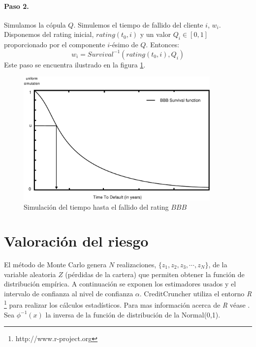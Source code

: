\paragraph{Paso 2.} Simulamos la c\'opula $Q$. Simulemos el tiempo de fallido del
cliente $i$, $w_i$. Disponemos del rating inicial, $rating(t_0,i)$ y un valor
$Q_i \in [0,1]$ proporcionado por el componente $i$-\'esimo de $Q$. Entonces:
\begin{displaymath}
w_i = Survival^{-1}(rating(t_0,i),Q_i)
\end{displaymath}
Este paso se encuentra ilustrado en la figura \ref{simttd}.

\begin{figure}[!hb]
\begin{center}
\includegraphics[width=10cm,angle=0]{./images/simttd.eps}
\caption{Simulaci\'on del tiempo hasta el fallido del rating $BBB$}
\label{simttd}
\end{center}
\end{figure}



\section{Valoraci\'on del riesgo}

El m\'etodo de Monte Carlo genera $N$ realizaciones, $\{z_1,z_2,z_3,\cdots,z_N\}$,
de la variable aleatoria $Z$ (p\'erdidas de la cartera) que permiten obtener la
funci\'on de distribuci\'on emp\'irica. A continuaci\'on se exponen los estimadores
usados y el intervalo de confianza al nivel de confianza $\alpha$. CreditCruncher
utiliza el entorno \emph{R} \footnote{http://www.r-project.org} para realizar los
c\'alculos estad\'isticos. Para mas informaci\'on acerca de \emph{R} v\'ease \cite{stats:R}.
Sea $\phi^{-1}(x)$ la inversa de la funci\'on de distribuci\'on de la Normal(0,1).

